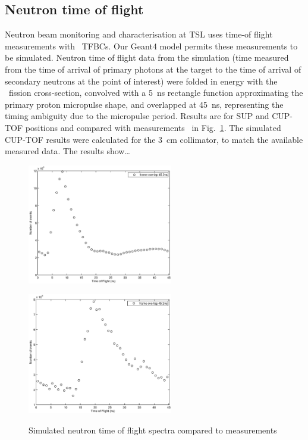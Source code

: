 \documentclass[11pt,a4paper]{IEEEtran}
\let\MYoriglatexcaption\caption
\renewcommand{\caption}[2][\relax]{\MYoriglatexcaption[#2]{#2}}
\def\U238{\BPChem{\^{238}U}}
\begin{document}
\subsection{Neutron time of flight}
Neutron beam monitoring and characterisation at TSL uses time-of flight measurements with \U238\ TFBCs.
Our Geant4 model permits these measurements to be simulated.
Neutron time of flight data from the simulation (time measured from the time of arrival of primary photons at the target to the time of arrival of secondary neutrons at the point of interest) were folded in energy with the \U238\ fission cross-section, convolved with a \SI{5}{\ns} rectangle function approximating the primary proton micropulse shape, and overlapped at \SI{45}{\ns}, representing the timing ambiguity due to the micropulse period.
Results are for SUP and CUP-TOF positions and compared with measurements~\cite{Prokofiev2009,Prokofiev14} in Fig.~\ref{fig:TOFSpectra}.
The simulated CUP-TOF results were calculated for the \SI{3}{\cm} collimator, to match the available measured data.
The results show\ldots{}

\begin{figure}[t]
    \begin{minipage}{\columnwidth}
        \includegraphics[width=2.5in]{TOF3frameoverlap.eps}
    	\label{fig:TOFFrameOverlapspectrum}
    \end{minipage}
    \begin{minipage}{\columnwidth}
        \includegraphics[width=2.5in]{SUP10frameoverlap.eps}
        \label{fig:SUP10FrameOverlapspectrum}
    \end{minipage}
    \caption{Simulated neutron time of flight spectra compared to measurements}
    \label{fig:TOFSpectra}
\end{figure}
\end{document}
